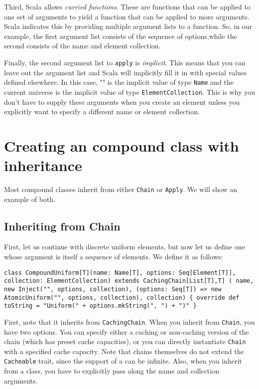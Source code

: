 Third, Scala allows \emph{curried functions}. These are functions that can be applied to one set of arguments to yield a function that can be applied to more arguments. Scala indicates this by providing multiple argument lists to a function. So, in our example, the first argument list consists of the sequence of options,while the second consists of the name and element collection.

Finally, the second argument list to \texttt{apply} is \emph{implicit}. This means that you can leave out the argument list and Scala will implicitly fill it in with special values defined elsewhere. In this case, "" is the implicit value of type \texttt{Name} and the current universe is the implicit value of type \texttt{ElementCollection}. This is why you don't have to supply these arguments when you create an element unless you explicitly want to specify a different name or element collection.

\section{Creating an compound class with inheritance}

Most compound classes inherit from either \texttt{Chain} or \texttt{Apply}. We will show an example of both.

\subsection{Inheriting from Chain}

First, let us continue with discrete uniform elements, but now let us define one whose argument is itself a sequence of elements. We define it as follows:

\begin{flushleft}
\texttt{class CompoundUniform[T](name: Name[T], options: Seq[Element[T]], 
\newline collection: ElementCollection) extends CachingChain[List[T],T] (
name,
\newline \tab new Inject("", options, collection),
\newline \tab (options: Seq[T]) => new AtomicUniform("", options, collection),
collection) \{
\newline \tab override def toString = "Uniform(" + options.mkString(", ") + ")"
\newline \}
}
\end{flushleft}

First, note that it inherits from \texttt{CachingChain}. When you inherit from \texttt{Chain}, you have two options. You can specify either a caching or non-caching version of the chain (which has preset cache capacities), or you can directly instantiate \texttt{Chain} with a specified cache capacity. Note that chains themselves do not extend the \texttt{Cacheable} trait, since the support of a can be infinite. Also, when you inherit from a class, you have to explicitly pass along the name and collection arguments.

